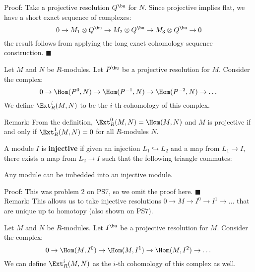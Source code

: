 \documentclass[10 pt]{article}
\newtheorem{cor}{Corollary}[section]
\newtheorem{lem}{Lemma}[section]
\newtheorem{prop}{Proposition}[section]
\newtheorem{propconstr}{Proposition-Construction}[section]
\newcommand\begin{lemma}{\begin{lem}}
\newcommand\begin{proposition}{\begin{prop}}
\newcommand\begin{proof}{\begin{proof}}
\newcommand\begin{corollary}{\begin{cor}}
\newcommand\begin{proposition}constr{\begin{propconstr}}
\newcommand\end{definition}{\end{defn}}
\newcommand\end{lemma}{\end{lem}}
\newcommand\end{corollary}{\end{cor}}
\newcommand\end{proposition}{\end{prop}}
\newcommand\end{proof}{\end{proof}}
\newcommand\end{proposition}constr{\end{propconstr}}
\begin{document}
Proof: Take a projective resolution $Q^\bu$ for $N$.  Since projective implies flat, we have a short exact sequence of complexes:
$$0\rightarrow M_1\otimes Q^\bu\rightarrow M_2\otimes Q^\bu\rightarrow M_3\otimes Q^\bu\rightarrow 0$$
the result follows from applying the long exact cohomology sequence construction. $\blacksquare$

\begin{definition} Let $M$ and $N$ be $R$-modules.  Let $P^\bu$ be a projective resolution for $M$.  Consider the complex:
$$0\rightarrow \Hom(P^0,N)\rightarrow \Hom(P^{-1},N)\rightarrow \Hom(P^{-2},N)\rightarrow \dots$$
We define $\Ext^i_R(M,N)$ to be the $i$-th cohomology of this complex.
\end{definition}

Remark:  From the definition, $\Ext_R^0(M,N)=\Hom(M,N)$ and $M$ is projective if and only if $\Ext_R^1(M,N)=0$ for all $R$-modules $N$.

\begin{definition} A module $I$ is {\bf injective} if given an injection $L_1\hookrightarrow L_2$ and a map from $L_1\rightarrow I$, there exists a map from $L_2\rightarrow I$ such that the following triangle commutes:\\

\end{definition}

\begin{proposition} Any module can be imbedded into an injective module. \end{proposition}

Proof:  This was problem 2 on PS7, so we omit the proof here. $\blacksquare$\\

Remark:  This allows us to take injective resolutions $0\rightarrow M\rightarrow I^0\rightarrow I^1\rightarrow\dots$ that are unique up to homotopy (also shown on PS7).\\

\begin{proposition} Let $M$ and $N$ be $R$-modules.  Let $I^\bu$ be a projective resolution for $M$.  Consider the complex:
$$0\rightarrow \Hom(M,I^0)\rightarrow \Hom(M,I^1)\rightarrow \Hom(M,I^2)\rightarrow \dots$$
We can define $\Ext^i_R(M,N)$ as the $i$-th cohomology of this complex as well.\end{proposition}
\end{document}
